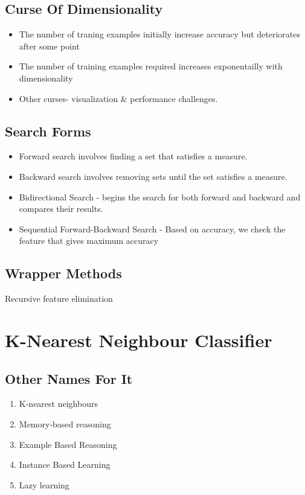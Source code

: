 \documentclass[11pt]{article}
\begin{document}
\subsection{Curse Of Dimensionality}
\label{sec:org078349f}
\begin{itemize}
\item The number of traning examples initially increase accuracy but deteriorates after some point
\item The number of training examples required increases exponentailly with dimensionality
\item Other curses- visualization \& performance challenges.
\end{itemize}
\subsection{Search Forms}
\label{sec:org49a0938}
\begin{itemize}
\item Forward search involves finding a set that satisfies a measure.
\item Backward search involves removing sets until the set satisfies a measure.
\item Bidirectional Search - begins the search for both forward and backward and compares their results.
\item Sequential Forward-Backward Search - Based on accuracy, we  check the feature that gives maximum accuracy
\end{itemize}
\subsection{Wrapper Methods}
\label{sec:orgfa8ff9b}
Recursive feature elimination
\section{K-Nearest Neighbour Classifier}
\label{sec:orgf8c1439}
\subsection{Other Names For It}
\label{sec:orge2dbc5d}
\begin{enumerate}
\item K-nearest neighbours
\item Memory-based reasoning
\item Example Based Reasoning
\item Instance Based Learning
\item Lazy learning
\end{enumerate}
\end{document}
